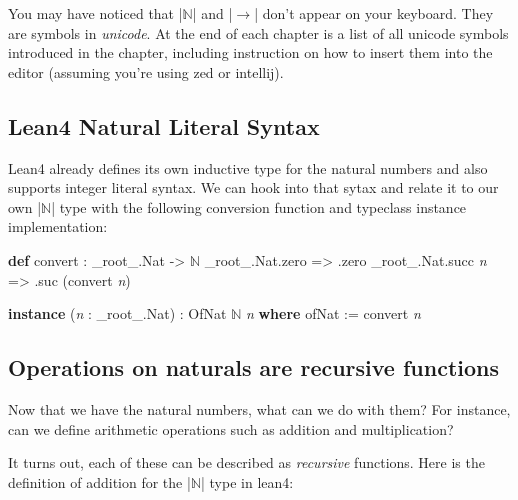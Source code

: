 \documentclass{memoir}
\newcommand{\PLFANat}{\ensuremath{\mathbb{N}}}
\newcommand{\PLFATo}{\ensuremath{\to}}
\begin{document}
\par
You may have noticed that \LeanVerb|\PLFANat{}| and \LeanVerb|\PLFATo{}| don't appear on your keyboard. They are
symbols in \emph{unicode}. At the end of each chapter is a list of all unicode
symbols introduced in the chapter, including instruction on how to insert them
into the editor (assuming you're using zed or intellij).

\par

\subsection{Lean4 Natural Literal Syntax}\label{PLFA--in--Lean----Part--1----Naturals----Lean4--Natural--Literal--Syntax}

\par
Lean4 already defines its own inductive type for the natural numbers and also
supports integer literal syntax. We can hook into that sytax and relate it to
our own \LeanVerb|\PLFANat{}| type with the following conversion function and typeclass instance
implementation:

\par
\begin{LeanVerbatim}
\textbf{def} convert : _root_.Nat -> \PLFANat{}
     _root_.Nat.zero   => .zero
     _root_.Nat.succ \textit{n} => .suc (convert \textit{n})

\textbf{instance} (\textit{n} : _root_.Nat) : OfNat \PLFANat{} \textit{n} \textbf{where}
    ofNat := convert \textit{n}
\end{LeanVerbatim}

\par

\subsection{Operations on naturals are recursive functions}\label{PLFA--in--Lean----Part--1----Naturals----Operations--on--naturals--are--recursive--functions}

\par
Now that we have the natural numbers, what can we do with them? For instance,
can we define arithmetic operations such as addition and multiplication?

\par
It turns out, each of these can be described as \emph{recursive} functions. Here is
the definition of addition for the \LeanVerb|\PLFANat{}| type in lean4:
\end{document}
